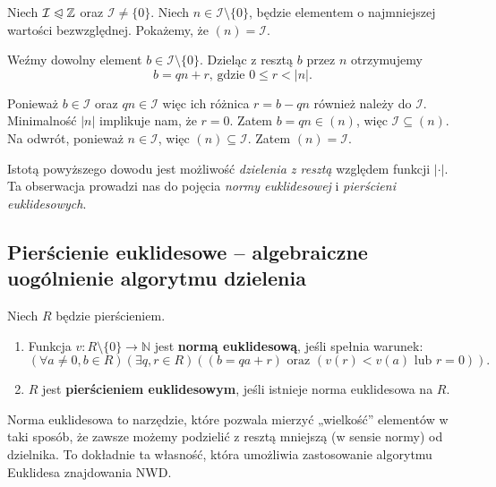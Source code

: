 \begin{eg}

	Niech $\mathcal{I} \trianglelefteqslant \mathbb{Z}$ oraz $\mathcal{I} \neq \{0\} $. Niech $n \in \mathcal{I}\setminus \{0\} $, będzie elementem o najmniejszej wartości bezwzględnej. Pokażemy, że $\left( n \right) = \mathcal{I}$.

	Weźmy dowolny element $b \in \mathcal{I}\setminus \{0\} $. Dzieląc z resztą $b$ przez $n$ otrzymujemy
	\[
	b = qn + r\text{, gdzie } 0 \le r < \left| n \right| 
	.\] 

	Ponieważ $b \in \mathcal{I}$ oraz $qn \in \mathcal{I}$ więc ich różnica $r = b - qn$ również należy do $\mathcal{I}$. Minimalność $\left| n \right| $ implikuje nam, że $r = 0$. Zatem  $b = qn \in \left( n \right) $, więc $\mathcal{I} \subseteq \left( n \right) $. Na odwrót, ponieważ $n \in \mathcal{I}$, więc $\left( n \right) \subseteq \mathcal{I}$. Zatem $\left( n \right) = \mathcal{I}$.
\end{eg}

\begin{remark}
Istotą powyższego dowodu jest możliwość \emph{dzielenia z resztą} względem funkcji $|\cdot|$. Ta obserwacja prowadzi nas do pojęcia \emph{normy euklidesowej} i \emph{pierścieni euklidesowych}.
\end{remark}

\subsection*{Pierścienie euklidesowe – algebraiczne uogólnienie algorytmu dzielenia}

\begin{definition}
Niech $R$ będzie pierścieniem.
\begin{enumerate}[label=\arabic*)]
    \item Funkcja $v: R \setminus \{0\} \to \mathbb{N}$ jest \textbf{normą euklidesową}, jeśli spełnia warunek:
	    \[
	    \left(\forall a\neq 0, b \in R \right)\left(\exists q,r \in R \right)\left(\left( b = qa + r \right)\text{ oraz } \left( v\left( r \right) < v\left( a \right) \text{ lub } r = 0 \right)    \right)
	    .\] 
    \item $R$ jest \textbf{pierścieniem euklidesowym}, jeśli istnieje norma euklidesowa na $R$.
\end{enumerate}
\end{definition}

\begin{intuition}
Norma euklidesowa to narzędzie, które pozwala mierzyć „wielkość” elementów w taki sposób, że zawsze możemy podzielić z resztą mniejszą (w sensie normy) od dzielnika. To dokładnie ta własność, która umożliwia zastosowanie algorytmu Euklidesa znajdowania NWD.
\end{intuition}

